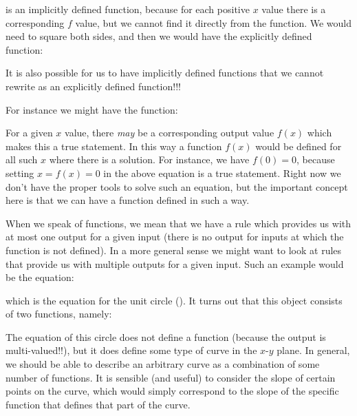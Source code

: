 	 is an implicitly defined function, because for each positive $x$ value there is a corresponding $f$ value, but we cannot find it directly from the function. We would need to square both sides, and then we would have the explicitly defined function:
	 	
	It is also possible for us to have implicitly defined functions that we cannot rewrite as an explicitly defined function!!! 
	
	For instance we might have the function:
	
	For a given $x$ value, there {\it may} be a corresponding output value $f(x)$ which makes this a true statement. In this way a function $f(x)$ would be defined for all such $x$ where there is a solution. For instance, we have $f(0) = 0$, because setting $x=f(x)=0$ in the above equation is a true statement. Right now we don't have the proper tools to solve such an equation, but the important concept here is that we can have a function defined in such a way. 
	
	When we speak of functions, we mean that we have a rule which provides us with at most one output for a given input (there is no output for inputs at which the function is not defined). In a more general sense we might want to look at rules that provide us with multiple outputs for a given input. Such an example would be the equation:
	
	which is the equation for the unit circle (). It turns out that this object consists of two functions, namely:
	
	The equation of this circle does not define a function (because the output is multi-valued!!), but it does define some type of curve in the $x$-$y$ plane. In general, we should be able to describe an arbitrary curve as a combination of some number of functions. It is sensible (and useful) to consider the slope of certain points on the curve, which would simply correspond to the slope of the specific function that defines that part of the curve. 
	
